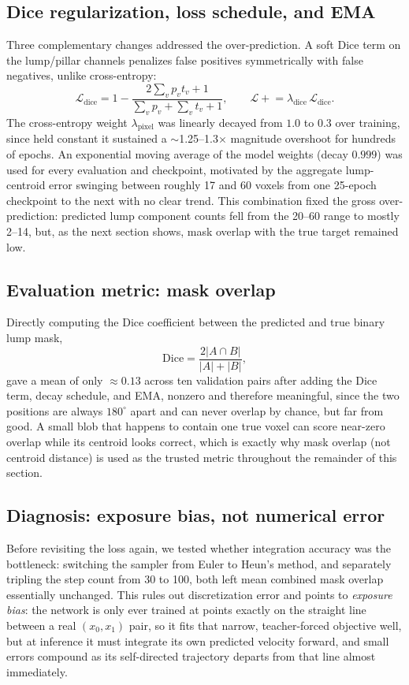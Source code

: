 \documentclass[11pt]{article}
\begin{document}
\subsection{Dice regularization, loss schedule, and EMA}
Three complementary changes addressed the over-prediction. A soft Dice term on the lump/pillar
channels penalizes false positives symmetrically with false negatives, unlike cross-entropy:
\begin{equation}
\mathcal{L}_{\text{dice}} = 1 - \frac{2\sum_v p_v t_v + 1}{\sum_v p_v + \sum_v t_v + 1}, \qquad
\mathcal{L} \mathrel{+}= \lambda_{\text{dice}}\,\mathcal{L}_{\text{dice}}. \label{eq:dice}
\end{equation}
The cross-entropy weight $\lambda_{\text{pixel}}$ was linearly decayed from $1.0$ to $0.3$ over
training, since held constant it sustained a $\sim$1.25--1.3$\times$ magnitude overshoot for
hundreds of epochs. An exponential moving average of the model weights (decay $0.999$) was used
for every evaluation and checkpoint, motivated by the aggregate lump-centroid error swinging
between roughly 17 and 60 voxels from one 25-epoch checkpoint to the next with no clear trend.
This combination fixed the gross over-prediction: predicted lump component counts fell from
the 20--60 range to mostly 2--14, but, as the next section shows, mask overlap with the true
target remained low.

\subsection{Evaluation metric: mask overlap}
Directly computing the Dice coefficient between the predicted and true binary lump mask,
\begin{equation}
\mathrm{Dice} = \frac{2|A\cap B|}{|A|+|B|},
\end{equation}
gave a mean of only $\approx0.13$ across ten validation pairs after adding the Dice term, decay
schedule, and EMA, nonzero and therefore meaningful, since the two positions are always
$180^\circ$ apart and can never overlap by chance, but far from good. A small blob that happens
to contain one true voxel can score near-zero overlap while its centroid looks correct, which is
exactly why mask overlap (not centroid distance) is used as the trusted metric throughout the
remainder of this section.

\subsection{Diagnosis: exposure bias, not numerical error}
Before revisiting the loss again, we tested whether integration accuracy was the bottleneck:
switching the sampler from Euler to Heun's method, and separately tripling the step count from
30 to 100, both left mean combined mask overlap essentially unchanged. This
rules out discretization error and points to \emph{exposure bias}: the network is only ever
trained at points exactly on the straight line between a real $(x_0,x_1)$ pair, so it fits that
narrow, teacher-forced objective well, but at inference it must integrate its own predicted
velocity forward, and small errors compound as its self-directed trajectory departs from that
line almost immediately.
\end{document}
